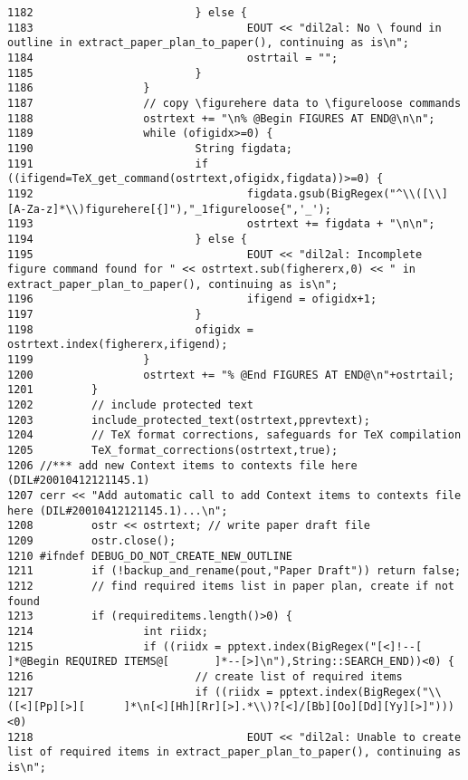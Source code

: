 \begin{verbatim}
1182                         } else {
1183                                 EOUT << "dil2al: No \ found in outline in extract_paper_plan_to_paper(), continuing as is\n";
1184                                 ostrtail = "";
1185                         }
1186                 }
1187                 // copy \figurehere data to \figureloose commands
1188                 ostrtext += "\n% @Begin FIGURES AT END@\n\n";
1189                 while (ofigidx>=0) {
1190                         String figdata;
1191                         if ((ifigend=TeX_get_command(ostrtext,ofigidx,figdata))>=0) {
1192                                 figdata.gsub(BigRegex("^\\([\\][A-Za-z]*\\)figurehere[{]"),"_1figureloose{",'_');
1193                                 ostrtext += figdata + "\n\n";
1194                         } else {
1195                                 EOUT << "dil2al: Incomplete figure command found for " << ostrtext.sub(fighererx,0) << " in extract_paper_plan_to_paper(), continuing as is\n";
1196                                 ifigend = ofigidx+1;
1197                         }
1198                         ofigidx = ostrtext.index(fighererx,ifigend);
1199                 }
1200                 ostrtext += "% @End FIGURES AT END@\n"+ostrtail;
1201         }
1202         // include protected text
1203         include_protected_text(ostrtext,pprevtext);
1204         // TeX format corrections, safeguards for TeX compilation
1205         TeX_format_corrections(ostrtext,true);
1206 //*** add new Context items to contexts file here (DIL#20010412121145.1)
1207 cerr << "Add automatic call to add Context items to contexts file here (DIL#20010412121145.1)...\n";
1208         ostr << ostrtext; // write paper draft file
1209         ostr.close();
1210 #ifndef DEBUG_DO_NOT_CREATE_NEW_OUTLINE
1211         if (!backup_and_rename(pout,"Paper Draft")) return false;
1212         // find required items list in paper plan, create if not found
1213         if (requireditems.length()>0) {
1214                 int riidx;
1215                 if ((riidx = pptext.index(BigRegex("[<]!--[     ]*@Begin REQUIRED ITEMS@[       ]*--[>]\n"),String::SEARCH_END))<0) {
1216                         // create list of required items
1217                         if ((riidx = pptext.index(BigRegex("\\([<][Pp][>][      ]*\n[<][Hh][Rr][>].*\\)?[<]/[Bb][Oo][Dd][Yy][>]")))<0)
1218                                 EOUT << "dil2al: Unable to create list of required items in extract_paper_plan_to_paper(), continuing as is\n";

\end{verbatim}
